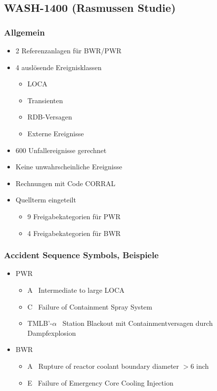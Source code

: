\documentclass[12pt]{article}
\begin{document}
\subsection{WASH-1400 (Rasmussen Studie)}

\subsubsection{Allgemein}
\begin{itemize}
  \item 2 Referenzanlagen für BWR/PWR
  \item 4 auslösende Ereignisklassen
  \begin{itemize}
    \item LOCA
    \item Transienten
    \item RDB-Versagen
    \item Externe Ereignisse
  \end{itemize}
  \item 600 Unfallereignisse gerechnet
  \item Keine unwahrscheinliche Ereignisse
  \item Rechnungen mit Code CORRAL
  \item Quellterm eingeteilt
  \begin{itemize}
    \item 9 Freigabekategorien für PWR
    \item 4 Freigabekategorien für BWR
  \end{itemize} 
\end{itemize}

\subsubsection{Accident Sequence Symbols, Beispiele}
\begin{itemize}
  \item PWR
  \begin{itemize}
    \item A \textrightarrow\ Intermediate to large LOCA
    \item C \textrightarrow\ Failure of Containment Spray System
    \item TMLB'-\(\alpha\) \textrightarrow\ Station Blackout mit Containmentversagen durch Dampfexplosion
  \end{itemize}
  \item BWR
  \begin{itemize}
    \item A \textrightarrow\ Rupture of reactor coolant boundary diameter \(>6\) inch
    \item E \textrightarrow\ Failure of Emergency Core Cooling Injection
  \end{itemize}
\end{itemize}
\end{document}
